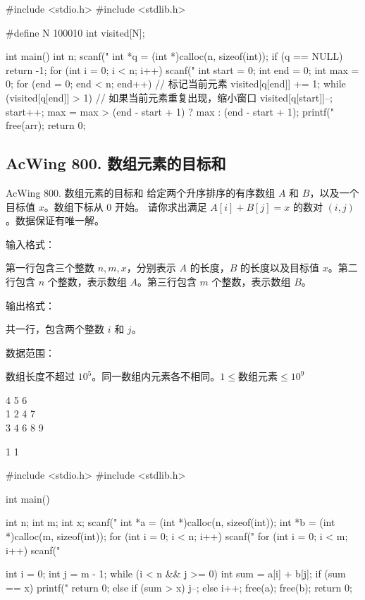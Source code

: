 \begin{mycpptwocol}[最长连续不重复子序列]
#include <stdio.h>
#include <stdlib.h>

#define N 100010
int visited[N];

int main()
{
    int n;
    scanf("%
    int *q = (int *)calloc(n, sizeof(int));
    if (q == NULL) {
        return -1;
    }
    for (int i = 0; i < n; i++) {
        scanf("%
    }
    int start = 0;
    int end = 0;
    int max = 0;
    for (end = 0; end < n; end++) {
        // 标记当前元素
        visited[q[end]] += 1;
        while (visited[q[end]] > 1) {
            // 如果当前元素重复出现，缩小窗口
            visited[q[start]]--;
            start++;
        }
        max = max > (end - start + 1) ? max : (end - start + 1);
    }
    printf("%
    free(arr);
    return 0;
}
\end{mycpptwocol}

\subsection{AcWing 800. 数组元素的目标和}
\begin{titledbox}{AcWing 800. 数组元素的目标和}
给定两个升序排序的有序数组 $A$ 和 $B$，以及一个目标值 $x$。数组下标从 $0$ 开始。
请你求出满足 $A[i] + B[j] = x$ 的数对 $(i, j)$。数据保证有唯一解。

输入格式：

第一行包含三个整数 $n,m,x$，分别表示 $A$ 的长度，$B$ 的长度以及目标值 $x$。第二行包含 $n$ 个整数，表示数组 $A$。第三行包含 $m$ 个整数，表示数组 $B$。

输出格式：

共一行，包含两个整数 $i$ 和 $j$。

数据范围：

数组长度不超过 $10^5$。同一数组内元素各不相同。$1 \le \text{数组元素} \le 10^9$

\begin{inputblock}
    4 5 6 \\
    1 2 4 7 \\
    3 4 6 8 9
\end{inputblock}
\begin{outputblock}
    1 1
\end{outputblock}
\end{titledbox}

\begin{mycpptwocol}[数组元素的目标和]
#include <stdio.h>
#include <stdlib.h>

int main()
{
    int n;
    int m;
    int x;
    scanf("%
    int *a = (int *)calloc(n, sizeof(int));
    int *b = (int *)calloc(m, sizeof(int));
    for (int i = 0; i < n; i++) {
        scanf("%
    }
    for (int i = 0; i < m; i++) {
        scanf("%
    }
    
    int i = 0;
    int j = m - 1;
    while (i < n && j >= 0) {
        int sum = a[i] + b[j];
        if (sum == x) {
            printf("%
            return 0;
        } else if (sum > x) {
            j--;
        } else {
            i++;
        }
    }
    free(a);
    free(b);
    return 0;
}
\end{mycpptwocol}

